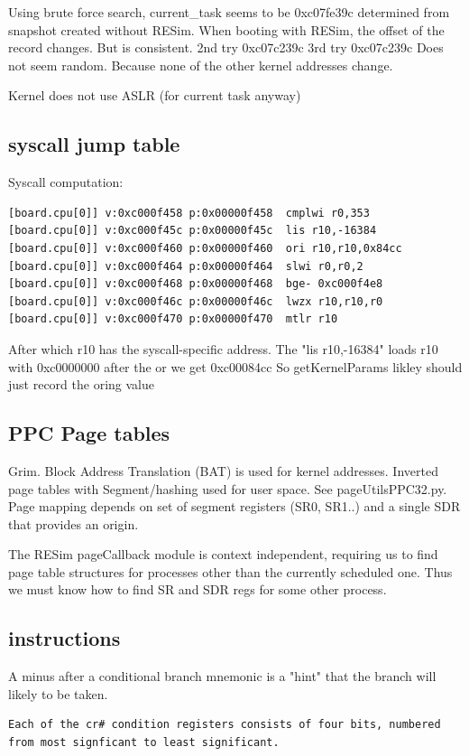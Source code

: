 \documentclass[titlepage]{article}
\begin{document}
\begin{appendices}
Using brute force search, current\_task seems to be 0xc07fe39c
determined from snapshot created without RESim.
When booting with RESim, the offset of the record changes.
But is consistent.
2nd try                                             0xc07c239c
3rd try                                             0xc07c239c
Does not seem random.  Because none of the other kernel addresses change.

Kernel does not use ASLR (for current task anyway)

\subsection{syscall jump table}
Syscall computation:
\begin{verbatim}
[board.cpu[0]] v:0xc000f458 p:0x00000f458  cmplwi r0,353
[board.cpu[0]] v:0xc000f45c p:0x00000f45c  lis r10,-16384
[board.cpu[0]] v:0xc000f460 p:0x00000f460  ori r10,r10,0x84cc
[board.cpu[0]] v:0xc000f464 p:0x00000f464  slwi r0,r0,2
[board.cpu[0]] v:0xc000f468 p:0x00000f468  bge- 0xc000f4e8
[board.cpu[0]] v:0xc000f46c p:0x00000f46c  lwzx r10,r10,r0
[board.cpu[0]] v:0xc000f470 p:0x00000f470  mtlr r10
\end{verbatim}
After which r10 has the syscall-specific address.
The "lis r10,-16384" loads r10 with 0xc0000000
after the or we get 0xc00084cc
So getKernelParams likley should just record the oring value


\subsection{PPC Page tables}
Grim.  
Block Address Translation (BAT) is used for kernel addresses.
Inverted page tables with Segment/hashing used for user space.  See pageUtilsPPC32.py.
Page mapping depends on set of segment registers (SR0, SR1..) and a single SDR that provides an origin.

The RESim pageCallback module is context independent, requiring us to find page table structures for
processes other than the currently scheduled one.  Thus we must know how to find SR and SDR regs for
some other process.

\subsection{instructions}
A minus after a conditional branch mnemonic is a "hint" that the branch will likely to be taken.
\begin{verbatim}
Each of the cr# condition registers consists of four bits, numbered from most signficant to least significant.


\end{verbatim}
\end{appendices}
\end{document}
